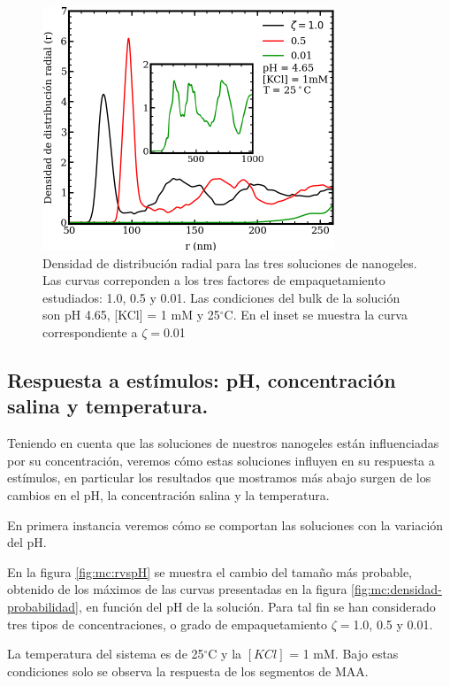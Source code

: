 	
	\begin{figure}
		\centering
		\includegraphics[width=0.45\linewidth]{Figures/graph-mc/rdf-normal.pdf}
		\caption{Densidad de distribuci\'on radial para las tres soluciones de nanogeles. Las curvas correponden a los tres factores de empaquetamiento estudiados: 1.0, 0.5 y 0.01. Las condiciones del bulk de la soluci\'on son pH 4.65, [KCl] = 1 mM y 25$^\circ$C. En el inset se muestra la curva correspondiente a $\zeta = $0.01}
		\label{fig:mc:rdf}
	\end{figure}
	
	
	\subsection{Respuesta a est\'imulos: pH, concentraci\'on salina y temperatura.}
	
	Teniendo en cuenta que las soluciones de nuestros nanogeles est\'an influenciadas por su concentraci\'on, veremos c\'omo estas soluciones influyen en su respuesta a est\'imulos, en particular los resultados que mostramos m\'as abajo surgen de los cambios en el pH, la concentraci\'on salina y la temperatura.
	
	En primera instancia veremos c\'omo se comportan las soluciones con la variaci\'on del pH.
	
	En la figura \ref{fig:mc:rvspH} se muestra el cambio del tama\~no m\'as probable, obtenido de los m\'aximos de las curvas presentadas en la figura \ref{fig:mc:densidad-probabilidad}, en funci\'on del pH de la soluci\'on. Para tal fin se han considerado tres tipos de concentraciones, o grado de empaquetamiento $\zeta = $1.0, 0.5 y 0.01.
	
	La temperatura del sistema es de 25$^\circ$C y la $[KCl]$ = 1 mM. Bajo estas condiciones solo se observa la respuesta de los segmentos de MAA.
	
	
	
